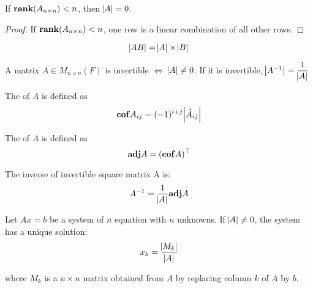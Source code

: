 \begin{theorem}
    If $\displaystyle \mathbf{rank}( A_{n \times n} ) < n$, then $\abs{A} = 0$.
\end{theorem}
\begin{proof}
    If $\displaystyle \mathbf{rank}( A_{n \times n} ) < n$, one row is a linear combination of all other rows.
\end{proof}



\begin{theorem}
	\begin{equation}
		\abs{AB} = \abs{A} \times \abs{B}
	\end{equation}
\end{theorem}

\begin{theorem}
	A matrix $A \in M_{n \times n}(F)$ is invertible $\Leftrightarrow$ $\abs{A} \neq 0$. If it is invertible, $\abs{A^{-1}} = \dfrac{1}{\abs{A}}$
\end{theorem}

\begin{definition}
    The  of $A$ is defined as 
    \begin{equation}
        \displaystyle \mathbf{cof} \displaystyle A_{ij} = (-1)^{i+j} \abs{\tilde{A}_{ij}}
    \end{equation}
\end{definition}


\begin{definition}
    The  of $A$ is defined as
    \begin{equation}
        \displaystyle \mathbf{adj} \displaystyle A = (\displaystyle \mathbf{cof} \displaystyle A)^\top
    \end{equation}
\end{definition}

\begin{theorem}
    The inverse of invertible square matrix A is:
    \begin{equation*}
        A^{-1} = \frac{1}{\abs{A}} \displaystyle \mathbf{adj} \displaystyle A
    \end{equation*}
\end{theorem}


\begin{theorem}
	Let $Ax=b$ be a system of $n$ equation with $n$ unknowns. If $\abs{A} \neq 0$, the system has a unique solution:
	\begin{equation}
		x_k = \frac{\abs{M_k}}{\abs{A}}
	\end{equation}
	
	where $M_k$ is a $n\times n$ matrix obtained from $A$ by replacing column $k$ of $A$ by $b$.
\end{theorem}

